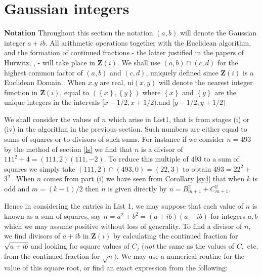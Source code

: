 \documentclass[12pt]{article}
\begin{document}
\section{Gaussian integers\label{gi}}

\textbf{Notation} Throughout this section the notation $\left( a,b\right) $
will denote the Gaussian integer $a+ib.$ All arithmetic operations together
with the Euclidean algorithm, and the formation of continued fractions - the
latter justified in the papers of Hurwitz, \cite{Hurwitz:1888:UEC},\cite%
{Hurwitz:1889:UAK} - will take place in $\mathbf{Z}\left( i\right) .$ We
shall use $\left( a,b\right) \cap (c,d)$ for the highest common factor of $%
\left( a,b\right) $ and $\left( c,d\right) $, uniquely defined since $%
\mathbf{Z}\left( i\right) $ is a Euclidean Domain.. When $x.y$ are real, ni$%
\left( x,y\right) $ will denote the nearest integer function in $\mathbf{Z}%
\left( i\right) $, equal to $\left( \left\{ x\right\} ,\left\{ y\right\}
\right) $ where $\left\{ x\right\} $ and $\left\{ y\right\} $ are the unique
integers in the intervals $[x-1/2,x+1/2).$and $[y-1/2,y+1/2)$

We shall consider the values of $n$ which arise in List1, that is from
stages (i) or (iv) in the algorithm in the previous section. Such numbers
are either equal to sums of squares or to divisors of such sums. For
instance if we consider $n=493$ by the method of section \ref{ls} we find
that $n$ is a divisor of $111^{2}+4=\left( 111,2\right) \left( 111,-2\right)
.$ To reduce this multiple of $493$ to a sum of squares we simply take $%
\left( 111,2\right) \cap \left( 493,0\right) =\left( 22,3\right) $ to obtain 
$493=22^{2}+$ $3^{2.}.$ When $n$ comes from part (i) we have seen from
Corollary \ref{sy4} that when $k$ is odd and $m=\left( k-1\right) /2$ then $%
n $ is given directly by $n=B_{m+1}^{2}+C_{m+1}^{2}.$

Hence in considering the entries in List 1, we may suppose that each value
of $n$ is known as a sum of squares, say $n=a^{2}+b^{2}=\left( a+ib\right)
\left( a-ib\right) $ for integers $a,b$ which we may assume positive without
loss of generality. To find a divisor of $n,$ we find divisors of $a+ib$ in $%
\mathbf{Z}\left( i\right) $ by calculating the continued fraction for $\sqrt{%
a+ib}$ and looking for square values of $C_{j}$ (\textit{not} the same as
the values of $C,$ etc. from the continued fraction for $\sqrt{n}).$ We may
use a numerical routine for the value of this square root, or find an exact
expression from the following:
\end{document}
